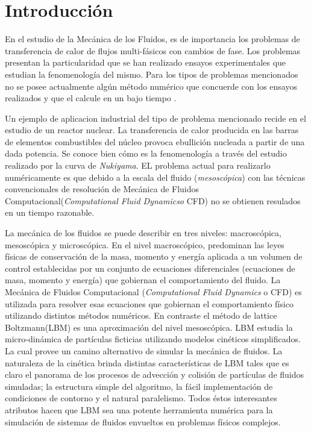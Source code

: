 \chapter{Introducción}
\graphicspath{{figs/cap1/}}
\label{cap1}


En el estudio de la Mecánica de los Fluidos, es de importancia los problemas de transferencia de calor de flujos multi-fásicos con cambios de fase. 
Los problemas presentan la particularidad que se han realizado ensayos experimentales que estudian la fenomenología del mismo.
Para los tipos de problemas mencionados no se posee actualmente algún método numérico que concuerde con los ensayos realizados y que el calcule en un bajo tiempo .

Un ejemplo de aplicacion industrial del tipo de problema mencionado recide en el estudio de un reactor nuclear.
La transferencia de calor producida en las barras de elementos combustibles del núcleo provoca ebullición nucleada a partir de una dada potencia.
Se conoce bien cómo es la fenomenología a través del estudio realizado por la curva de \textit{Nukiyama}. 
EL problema actual para realizarlo numéricamente es que debido a la escala del fluido (\textit{mesoscópica}) con las técnicas convencionales de resolución de Mecánica de Fluidos Computacional(\textit{Computational Fluid Dynamicso} CFD)
no se obtienen resulados en un tiempo razonable.

La mecánica de los fluidos se puede describir en tres niveles: macroscópica, mesoscópica y microscópica.
En el nivel macroscópico, predominan las leyes físicas de conservación de la masa, momento y energía aplicada a un volumen de control establecidas por un conjunto de ecuaciones diferenciales (ecuaciones de masa, momento y energía) que gobiernan el comportamiento del fluido. La Mecánica de Fluidos Computacional (\textit{Computational Fluid Dynamics} o CFD) es utilizada para resolver esas ecuaciones que gobiernan el comportamiento físico utilizando distintos métodos numéricos. En contraste el método de lattice Boltzmann(LBM) es una aproximación del nivel mesoscópica. LBM estudia la micro-dinámica de partículas ficticias utilizando modelos cinéticos simplificados. La cual provee un camino alternativo de simular la mecánica de fluidos. La naturaleza de la cinética brinda distintas características de LBM tales que es claro el panorama de los procesos de advección y colisión de partículas de fluidos simuladas; la estructura simple del algoritmo, la fácil implementación de condiciones de contorno y el natural paralelismo. Todos éstos interesantes atributos hacen que LBM sea una potente herramienta numérica para la simulación de sistemas de fluidos envueltos en problemas físicos complejos.

